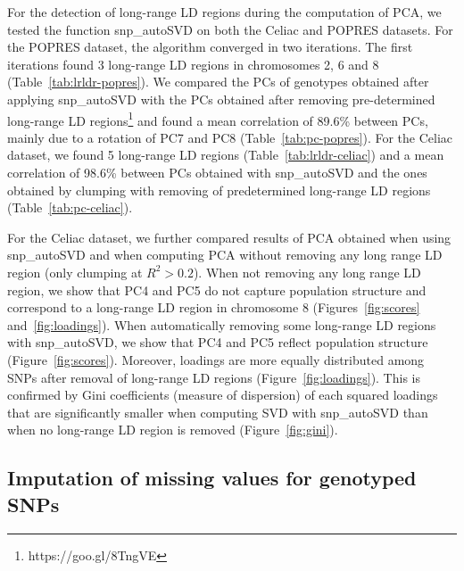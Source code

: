 \documentclass{bioinfo}
\begin{document}
For the detection of long-range LD regions during the computation of PCA, we tested the function snp\_autoSVD on both the Celiac and POPRES datasets. For the POPRES dataset, the algorithm converged in two iterations. The first iterations found 3 long-range LD regions in chromosomes 2, 6 and 8 (Table~\ref{tab:lrldr-popres}). 
We compared the PCs of genotypes obtained after applying snp\_autoSVD with the PCs obtained after removing pre-determined long-range LD regions\footnote{https://goo.gl/8TngVE} and found a mean correlation of 89.6\% between PCs, mainly due to a rotation of PC7 and PC8 (Table~\ref{tab:pc-popres}). For the Celiac dataset, we found 5 long-range LD regions (Table~\ref{tab:lrldr-celiac}) and a mean correlation of 98.6\% between PCs obtained with snp\_autoSVD and the ones obtained by clumping with removing of predetermined long-range LD regions (Table~\ref{tab:pc-celiac}).

For the Celiac dataset, we further compared results of PCA obtained when using snp\_autoSVD and when computing PCA without removing any long range LD region (only clumping at $R^2 > 0.2$). 
When not removing any long range LD region, we show that PC4 and PC5 do not capture population structure and correspond to a long-range LD region in chromosome 8 (Figures~\ref{fig:scores} and~\ref{fig:loadings}). 
When automatically removing some long-range LD regions with snp\_autoSVD, we show that PC4 and PC5 reflect population structure (Figure~\ref{fig:scores}). Moreover, loadings are more equally distributed among SNPs after removal of long-range LD regions (Figure~\ref{fig:loadings}). 
This is confirmed by Gini coefficients (measure of dispersion) of each squared loadings that are significantly smaller when computing SVD with snp\_autoSVD than when no long-range LD region is removed (Figure~\ref{fig:gini}).

\subsection{Imputation of missing values for genotyped SNPs}\label{sec:impute}
\end{document}
